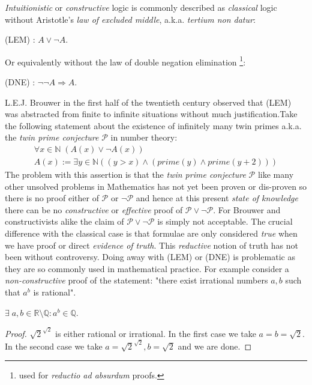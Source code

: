 	\emph{Intuitionistic} or \emph{constructive} logic is commonly described as \emph{classical} logic without Aristotle's \emph{law of excluded middle}, a.k.a. \emph{tertium non datur}:
	\begin{definition}
		(LEM) : $A \lor \neg A$.
	\end{definition} 
	Or equivalently without the law of double negation elimination \footnote{used for \emph{reductio ad absurdum} proofs.}:
	\begin{definition}
		(DNE) : $\neg \neg A \Rightarrow A$.
	\end{definition}
	L.E.J. Brouwer in the first half of the twentieth century observed that (LEM) was abstracted from finite to infinite situations without much justification.\newline Take the following statement about the existence of infinitely many twin primes a.k.a. the \emph{twin prime conjecture} $\mathcal{P}$ in number theory:
	\begin{gather*}
		\forall x \in \mathbb{N} \; (A(x) \lor \neg A(x)) \\
		A(x) := \exists y \in \mathbb{N} ( (y > x) \land (prime(y) \land prime(y+2)) )
	\end{gather*}
	The problem with this assertion is that the \emph{twin prime conjecture} $\mathcal{P}$ like many other unsolved problems in Mathematics has not yet been proven or dis-proven so there is no proof either of $\mathcal{P}$ or $\neg \mathcal{P}$ and hence at this present \emph{state of knowledge} there can be no \emph{constructive} or \emph{effective} proof of $\mathcal{P} \lor \neg\mathcal{P}$. \newline For Brouwer and constructivists alike the claim of $\mathcal{P} \lor \neg\mathcal{P}$ is simply not acceptable. The crucial difference with the classical case is that formulae are only considered \emph{true} when we have proof or direct \emph{evidence of truth}. \newline
	This \emph{reductive} notion of truth has not been without controversy. Doing away with (LEM) or (DNE) is problematic as they are so commonly used in mathematical practice. \newline
	 For example consider a \emph{non-constructive} proof of the statement: "there exist irrational numbers $a,b$ such that $a^b$ is rational".
	 \begin{prop}
	 	$\exists\; a,b \in \mathbb{R} \setminus \mathbb{Q} : a^b \in \mathbb{Q}$.
	 \end{prop}
 \begin{proof}
 	$\sqrt{2}^{\sqrt{2}}$ is either rational or irrational. \newline
 	 In the first case we take $a = b = \sqrt{2}$. \newline
 	In the second case we take $a = \sqrt{2}^{\sqrt{2}}, b= \sqrt{2}$ and we are done.
 \end{proof}
